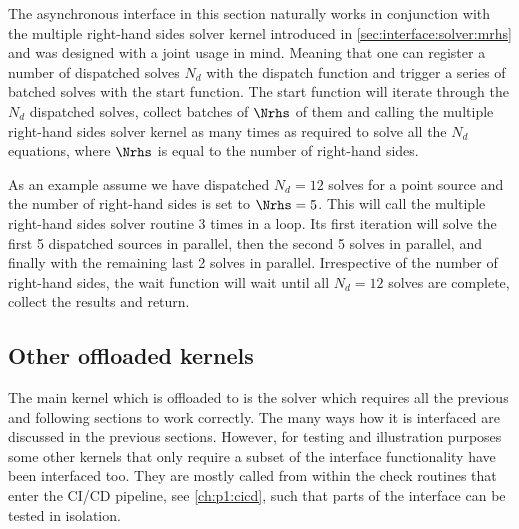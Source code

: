 The asynchronous interface in this section naturally works in conjunction with the multiple right-hand sides solver kernel introduced in \cref{sec:interface:solver:mrhs} and was designed with a joint usage in mind.
Meaning that one can register a number of dispatched solves $N_d$ with the dispatch function and trigger a series of batched solves with the start function.
The start function will iterate through the $N_d$ dispatched solves, collect batches of $\Nrhs$ of them and calling the multiple right-hand sides solver kernel as many times as required to solve all the $N_d$ equations, where $\Nrhs$ is equal to the number of right-hand sides.%

As an example assume we have dispatched $N_d=12$ solves for a point source and the number of right-hand sides is set to $\Nrhs=5$.
This will call the multiple right-hand sides solver routine \num{3} times in a loop.
Its first iteration will solve the first \num{5} dispatched sources in parallel, then the second \num{5} solves in parallel, and finally with the remaining last \num{2} solves in parallel.
Irrespective of the number of right-hand sides, the wait function will wait until all $N_d=12$ solves are complete, collect the results and return.

\subsection{Other offloaded kernels}

The main kernel which is offloaded to \quda is the solver which requires all the previous and following sections to work correctly.
The many ways how it is interfaced are discussed in the previous sections.
However, for testing and illustration purposes some other kernels that only require a subset of the interface functionality have been interfaced too.
They are mostly called from within the check routines that enter the CI/CD pipeline, see \cref{ch:p1:cicd}, such that parts of the interface can be tested in isolation.

